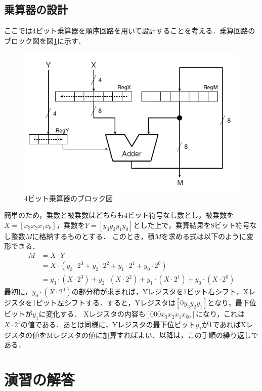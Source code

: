 \documentclass{jlreq}
\numberwithin{equation}{section}
\begin{document}
\subsection{乗算器の設計}
ここでは4ビット乗算器を順序回路を用いて設計することを考える．乗算回路のブロック図を図\ref{fig:4bit_mul_circuit}に示す．
\begin{figure}[H]
  \centering
  \includegraphics{assets/4bit_mul_circuit.png}
  \caption{4ビット乗算器のブロック図}
  \label{fig:4bit_mul_circuit}
\end{figure}
簡単のため，乗数と被乗数はどちらも4ビット符号なし数とし，被乗数を$X = [x_3x_2x_1x_0]$，乗数を$Y = [y_3y_2y_1y_0]$とした上で，乗算結果を8ビット符号なし整数$M$に格納するものとする．
このとき，積$M$を求める式は以下のように変形できる．
\begin{align}
  M & = X \cdot Y                                                                                             \\
    & = X \cdot (y_3 \cdot 2^3 + y_2 \cdot 2^2 + y_1 \cdot 2^1 + y_0 \cdot 2^0)                               \\
    & = y_3 \cdot (X \cdot 2^3) + y_2 \cdot (X \cdot 2^2) + y_1 \cdot (X \cdot 2^1) + y_0 \cdot (X \cdot 2^0)
\end{align}
最初に，$y_0 \cdot (X \cdot 2^0)$の部分積が求まれば，Yレジスタを1ビット右シフト，Xレジスタを1ビット左シフトする．すると，Yレジスタは$[0y_3y_2y_1]$となり，最下位ビットが$y_1$に変化する．
Xレジスタの内容も$[000x_3x_2x_1x_00]$になり，これは$X \cdot 2^1$の値である．あとは同様に，Yレジスタの最下位ビット$y_1$が1であればXレジスタの値をMレジスタの値に加算すればよい．以降は，この手順の繰り返しである．

\section{演習の解答}
\end{document}
